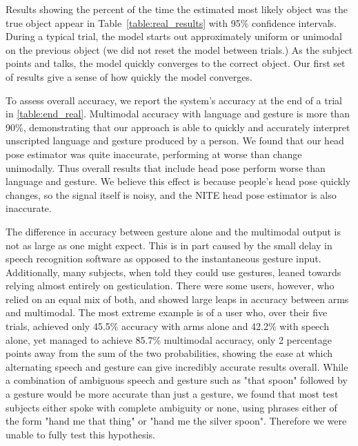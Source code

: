 \documentclass[letterpaper, 10 pt, conference]{ieeeconf}
\begin{document}
Results showing the percent of the time the estimated most likely
object was the true object appear in Table~\ref{table:real_results}
with 95\% confidence intervals.  During a typical trial, the model
starts out approximately uniform or unimodal on the previous object
(we did not reset the model between trials.) As the subject points and
talks, the model quickly converges to the correct object.  Our first
set of results give a sense of how quickly the model converges.

To assess overall accuracy, we report the system's accuracy at the end
of a trial in \ref{table:end_real}.  Multimodal accuracy with language
and gesture is more than 90\%, demonstrating that our approach is able
to quickly and accurately interpret unscripted language and gesture
produced by a person.  We found that our head pose estimator was quite
inaccurate, performing at worse than change unimodally.  Thus overall
results that include head pose perform worse than language and
gesture.  We believe this effect is because people's head pose quickly
changes, so the signal itself is noisy, and the NITE head pose
estimator is also inaccurate.

The difference in accuracy between gesture alone and the multimodal output is not as large as one might expect. This is in part caused by the small delay in speech recognition software as opposed to the instantaneous gesture input. Additionally, many subjects, when told they could use gestures, leaned towards relying almost entirely on gesticulation. There were some users, however, who relied on an equal mix of both, and showed large leaps in accuracy between arms and multimodal. The most extreme example is of a user who, over their five trials, achieved only 45.5\% accuracy with arms alone and 42.2\% with speech alone, yet managed to achieve 85.7\% multimodal accuracy, only 2 percentage points away from the sum of the two probabilities, showing the ease at which alternating speech and gesture can give incredibly accurate results overall. While a combination of ambiguous speech and gesture such as "that spoon" followed by a gesture would be more accurate than just a gesture, we found that most test subjects either spoke with complete ambiguity or none, using phrases either of the form "hand me that thing" or "hand me the silver spoon". Therefore we were unable to fully test this hypothesis.
\end{document}
